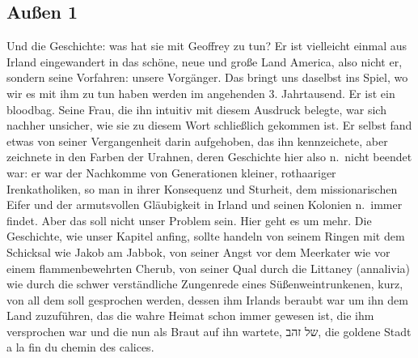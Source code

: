 \documentclass[
]{article}
\author{}
\date{\vspace{-2.5em}}
\begin{document}
\subsection{Außen 1}\label{auuxdfen-1}

Und die Geschichte: was hat sie mit Geoffrey zu tun? Er ist vielleicht
einmal aus Irland eingewandert in das schöne, neue und große Land
America, also nicht er, sondern seine Vorfahren: unsere Vorgänger. Das
bringt uns daselbst ins Spiel, wo wir es mit ihm zu tun haben werden im
angehenden 3. Jahrtausend. Er ist ein bloodbag. Seine Frau, die ihn
intuitiv mit diesem Ausdruck belegte, war sich nachher unsicher, wie sie
zu diesem Wort schließlich gekommen ist. Er selbst fand etwas von seiner
Vergangenheit darin aufgehoben, das ihn kennzeichete, aber zeichnete in
den Farben der Urahnen, deren Geschichte hier also n.~nicht beendet war:
er war der Nachkomme von Generationen kleiner, rothaariger
Irenkatholiken, so man in ihrer Konsequenz und Sturheit, dem
missionarischen Eifer und der armutsvollen Gläubigkeit in Irland und
seinen Kolonien n.~immer findet. Aber das soll nicht unser Problem sein.
Hier geht es um mehr. Die Geschichte, wie unser Kapitel anfing, sollte
handeln von seinem Ringen mit dem Schicksal wie Jakob am Jabbok, von
seiner Angst vor dem Meerkater wie vor einem flammenbewehrten Cherub,
von seiner Qual durch die Littaney (annalivia) wie durch die schwer
verständliche Zungenrede eines Süßenweintrunkenen, kurz, von all dem
soll gesprochen werden, dessen ihm Irlands beraubt war um ihn dem Land
zuzuführen, das die wahre Heimat schon immer gewesen ist, die ihm
versprochen war und die nun als Braut auf ihn wartete, של זהב, die
goldene Stadt a la fin du chemin des calices.
\end{document}
